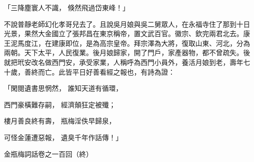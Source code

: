 \begin{showcontents}{}
「三降塵寰人不識，  倏然飛過岱東峰！」

不說普靜老師幻化孝哥兒去了。且說吳月娘與吳二舅眾人，在永福寺住了那到十日光景，果然大金國立了張邦昌在東京稱帝，置文武百官。徽宗、欽完兩君北去。康王泥馬度江，在建康即位，是為高宗皇帝。拜宗澤為大將，復取山東、河北，分為兩朝。天下太平，人民復業。後月娘歸家，開了門戶，家產器物，都不曾疏失。後就把玳安改名做西門安，承受家業，人稱呼為西門小員外，養活月娘到老，壽年七十歲，善終而亡。此皆平日好善看經之報也，有詩為證：

「閑閱遺書思惘然，  誰知天道有循環，

西門豪橫難存嗣，  經濟顛狂定被殲；

樓月善良終有壽，  瓶梅淫佚早歸泉，

可怪金蓮遭惡報，  遺臭千年作話傳！」

金瓶梅詞話卷之一百回（終）





\end{showcontents}


